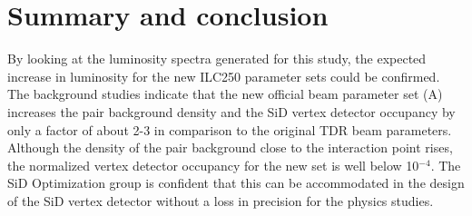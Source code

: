 \section{Summary and conclusion}
By looking at the luminosity spectra generated for this study, the expected increase in luminosity for the new ILC250 parameter sets could be confirmed.
The background studies indicate that the new official beam parameter set (A) increases the \Pep\Pem pair background density and the SiD vertex detector occupancy by only a factor of about 2-3 in comparison to the original TDR beam parameters.
Although the density of the pair background close to the interaction point rises, the normalized vertex detector occupancy for the new set is well below 10$^{-4}$.
The SiD Optimization group is confident that this can be accommodated in the design of the SiD vertex detector without a loss in precision for the physics studies.